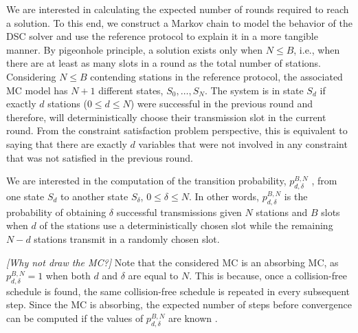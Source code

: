 \documentclass[journal]{IEEEtran}
\newcommand{\AzCom}[1]{{\it \color{magenta} [#1]}}
\begin{document}
We are interested in calculating the expected number of rounds required to reach a solution. To this end, we construct a Markov chain to model the behavior of the DSC solver and use the reference protocol to explain it in a more tangible manner.
By pigeonhole principle, a solution exists only when $N\leq B$, i.e., when there are at least as many slots in a round as the total number of stations. Considering $N\leq B$ contending stations in the reference protocol, the associated MC model has $N+1$ different states, $S_0, \dots, S_N$.
The system is in state $S_d$ if exactly $d$ stations ($0 \leq d \leq N$) were successful in the previous round and therefore, will deterministically choose their transmission slot in the current round.
From the constraint satisfaction problem perspective, this is equivalent to saying that there are exactly $d$ variables that were not involved in any constraint that was not satisfied in the previous round.

We are interested in the computation of the transition probability, $p_{d,\delta}^{B,N}$ , from one state $S_d$ to another state $S_\delta$, $0 \leq \delta \leq N$. In other words, $p_{d,\delta}^{B,N}$ is the probability of obtaining $\delta$ successful transmissions given $N$ stations and $B$ slots when $d$ of the stations use a deterministically chosen slot while the remaining $N-d$ stations transmit in a randomly chosen slot.

\AzCom{Why not draw the MC?}
Note that the considered MC is an absorbing MC, as $p_{d,\delta}^{B,N}=1$ when both $d$ and $\delta$ are equal to $N$. This is because, once a collision-free schedule is found, the same collision-free schedule is repeated in every subsequent step.
Since the MC is absorbing, the expected number of steps before convergence can be computed if the values of $p_{d,\delta}^{B,N}$ are known \cite{grinstead1997ip}.
\end{document}
